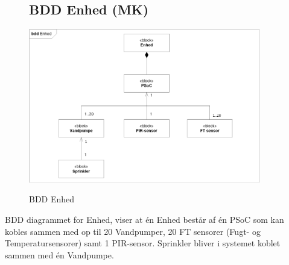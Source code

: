\begin{figure}[H] \centering
\subsection{BDD Enhed (MK)}
{\includegraphics[width=0.9\textwidth]{filer/systemarkitektur/BDD_Enhed}}
\caption{BDD Enhed}
\label{lab:bddenhed}
\raggedright
\end{figure}
BDD diagrammet for Enhed, viser at én Enhed består af én PSoC som kan kobles sammen med op til 20 Vandpumper, 20 FT sensorer (Fugt- og Temperatursensorer) samt 1 PIR-sensor. Sprinkler bliver i systemet koblet sammen med én Vandpumpe.

